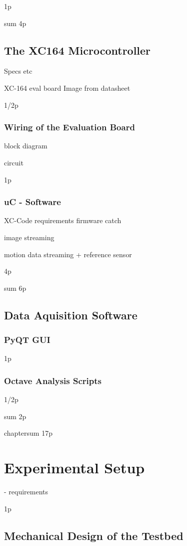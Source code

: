 \documentclass[12pt,a4paper]{article}
\begin{document}
1p

sum 4p
\subsection{The XC164 Microcontroller}

Specs etc

XC-164 eval board 
  Image from datasheet

1/2p

\subsubsection{Wiring of the Evaluation Board}

  block diagram

  circuit

1p

\subsubsection{uC - Software}

  XC-Code
    requirements
    firmware catch

    image streaming

    motion data streaming
      + reference sensor

4p

sum 6p


\subsection{Data Aquisition Software}

\subsubsection{PyQT GUI}
1p

\subsubsection{Octave Analysis Scripts}
1/2p


sum 2p

chaptersum 17p

\section{Experimental Setup}

- requirements

1p

\subsection{Mechanical Design of the Testbed}
\end{document}
